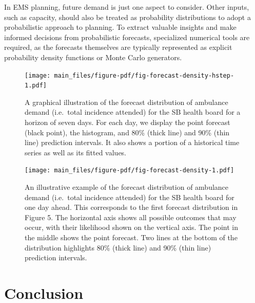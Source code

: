 \documentclass[
  authoryear,
  preprint,
  3p]{elsarticle}
\begin{document}
In EMS planning, future demand is just one aspect to consider. Other
inputs, such as capacity, should also be treated as probability
distributions to adopt a probabilistic approach to planning. To extract
valuable insights and make informed decisions from probabilistic
forecasts, specialized numerical tools are required, as the forecasts
themselves are typically represented as explicit probability density
functions or Monte Carlo generators.

\begin{figure}[H]

{\centering \texttt{[image: main\_files/figure-pdf/fig-forecast-density-hstep-1.pdf]}

}

\caption{\label{fig-forecast-density-hstep}A graphical illustration of
the forecast distribution of ambulance demand (i.e.~total incidence
attended) for the SB health board for a horizon of seven days. For each
day, we display the point forecast (black point), the histogram, and
80\% (thick line) and 90\% (thin line) prediction intervals. It also
shows a portion of a historical time series as well as its fitted
values.}

\end{figure}

\begin{figure}[H]

{\centering \texttt{[image: main\_files/figure-pdf/fig-forecast-density-1.pdf]}

}

\caption{\label{fig-forecast-density}An illustrative example of the
forecast distribution of ambulance demand (i.e.~total incidence
attended) for the SB health board for one day ahead. This corresponds to
the first forecast distribution in Figure 5. The horizontal axis shows
all possible outcomes that may occur, with their likelihood shown on the
vertical axis. The point in the middle shows the point forecast. Two
lines at the bottom of the distribution highlights 80\% (thick line) and
90\% (thin line) prediction intervals.}

\end{figure}

\hypertarget{sec-conclusion}{%
\section{Conclusion}\label{sec-conclusion}}
\end{document}
